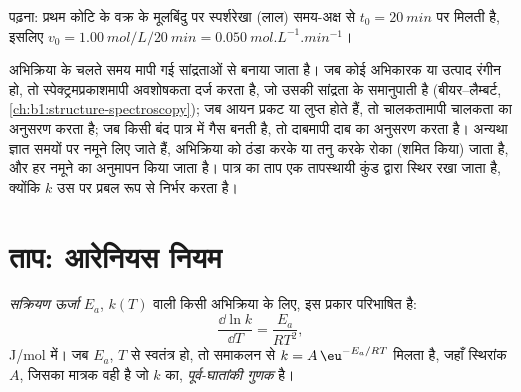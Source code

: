 \begin{omfigure}

{\small {} पढ़ना: प्रथम कोटि के वक्र के मूलबिंदु पर स्पर्शरेखा (लाल)
समय-अक्ष से $t_0 = \qty{20}{min}$ पर मिलती है, इसलिए $v_0 =
\qty{1.00}{mol/L}/\qty{20}{min} = \qty{0.050}{mol.L^{-1}.min^{-1}}$।}
\end{omfigure}

\begin{inthelab}
 अभिक्रिया के चलते समय मापी गई सांद्रताओं से बनाया जाता है।
जब कोई अभिकारक या उत्पाद रंगीन हो, तो स्पेक्ट्रमप्रकाशमापी
अवशोषकता दर्ज करता है, जो उसकी सांद्रता के समानुपाती है (बीयर--लैम्बर्ट,
\cref{ch:b1:structure-spectroscopy}); जब आयन प्रकट या लुप्त होते हैं, तो
चालकतामापी चालकता का अनुसरण करता है; जब किसी बंद पात्र में गैस बनती है,
तो दाबमापी दाब का अनुसरण करता है। अन्यथा ज्ञात समयों पर नमूने लिए जाते हैं,
अभिक्रिया को ठंडा करके या तनु करके रोका (शमित किया) जाता है,
और हर नमूने का अनुमापन किया जाता है। पात्र का ताप एक तापस्थायी
कुंड द्वारा स्थिर रखा जाता है, क्योंकि $k$ उस पर प्रबल रूप से निर्भर करता है।
\end{inthelab}

\section{ताप: आरेनियस नियम}

\begin{definition}[सक्रियण ऊर्जा]\label{def:b1:rate-laws:activation-energy}
\emph{सक्रियण ऊर्जा} $E_a$,  $k(T)$ वाली किसी
अभिक्रिया के लिए, इस प्रकार परिभाषित है:
\[
  \frac{\dd \ln k}{\dd T} = \frac{E_a}{RT^2} ,
\]
\unit{J/mol} में। जब $E_a$, $T$ से स्वतंत्र हो, तो समाकलन से
$k = A\,\eu^{-E_a/RT}$ मिलता है, जहाँ स्थिरांक $A$, जिसका मात्रक वही है जो $k$ का,
\emph{पूर्व-घातांकी गुणक} है।
\end{definition}

